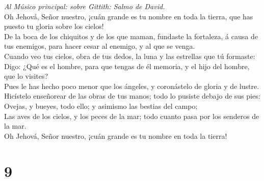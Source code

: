  \emph{Al Músico principal: sobre Gittith: Salmo de
David.}\\
Oh Jehová, Señor nuestro, ¡cuán grande es tu nombre en toda la tierra,
que has puesto tu gloria sobre los cielos!\\
 De la boca de los chiquitos y de los que maman, fundaste la
fortaleza, á causa de tus enemigos, para hacer cesar al enemigo, y al
que se venga.\\
 Cuando veo tus cielos, obra de tus dedos, la luna y las
estrellas que tú formaste:\\
 Digo: ¿Qué es el hombre, para que tengas de él memoria, y
el hijo del hombre, que lo visites?\\
 Pues le has hecho poco menor que los ángeles, y coronástelo
de gloria y de lustre.\\
 Hicístelo enseñorear de las obras de tus manos; todo lo
pusiste debajo de sus pies:\\
 Ovejas, y bueyes, todo ello; y asimismo las bestias del
campo;\\
 Las aves de los cielos, y los peces de la mar; todo cuanto
pasa por los senderos de la mar.\\
 Oh Jehová, Señor nuestro, ¡cuán grande es tu nombre en toda
la tierra!

\hypertarget{section-8}{%
\section{9}\label{section-8}}

